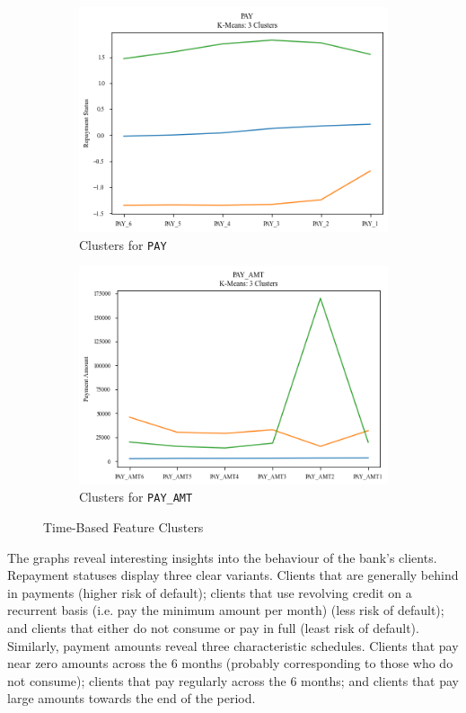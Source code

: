 \documentclass{article}
\newcommand{\code}{\texttt}
\begin{document}
\begin{figure}[ht]
	\centering
	\begin{subfigure}{.5\textwidth}
		\centering
		\includegraphics[width=.8\linewidth]{pay_clusters}
		\caption{Clusters for \code{PAY}}
		\label{fig:time_clusters_pay}
	\end{subfigure}%
	\begin{subfigure}{.5\textwidth}
		\centering
		\includegraphics[width=.8\linewidth]{pay_amt_clusters}
		\caption{Clusters for \code{PAY\_AMT}}
		\label{fig:time_clusters_pay_amt}
	\end{subfigure}
	\caption{Time-Based Feature Clusters}
	\label{fig:time_clusters}
\end{figure}

The graphs reveal interesting insights into the behaviour of the bank's clients. Repayment statuses display three clear variants. Clients that are generally behind in payments (higher risk of default); clients that use revolving credit on a recurrent basis (i.e. pay the minimum amount per month) (less risk of default); and clients that either do not consume or pay in full (least risk of default). Similarly, payment amounts reveal three characteristic schedules. Clients that pay near zero amounts across the 6 months (probably corresponding to those who do not consume); clients that pay regularly across the 6 months; and clients that pay large amounts towards the end of the period. 
\end{document}
